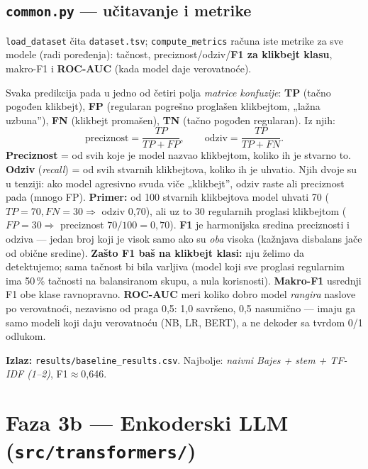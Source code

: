 \documentclass[11pt,a4paper]{article}
\newcommand{\kod}[1]{\texttt{#1}}
\begin{document}
\subsection{\texttt{common.py} --- učitavanje i metrike}
\kod{load\_dataset} čita \kod{dataset.tsv}; \kod{compute\_metrics} računa iste metrike
za sve modele (radi poređenja): tačnost, preciznost/odziv/\textbf{F1 za klikbejt
klasu}, makro-F1 i \textbf{ROC-AUC} (kada model daje verovatnoće).

\begin{teorija}
Svaka predikcija pada u jedno od četiri polja \emph{matrice konfuzije}: \textbf{TP}
(tačno pogođen klikbejt), \textbf{FP} (regularan pogrešno proglašen klikbejtom, „lažna
uzbuna''), \textbf{FN} (klikbejt promašen), \textbf{TN} (tačno pogođen regularan). Iz
njih:
\[
\text{preciznost}=\frac{TP}{TP+FP}, \qquad \text{odziv}=\frac{TP}{TP+FN}.
\]
\textbf{Preciznost} = od svih koje je model nazvao klikbejtom, koliko ih je stvarno to.
\textbf{Odziv} (\emph{recall}) = od svih stvarnih klikbejtova, koliko ih je uhvatio.
Njih dvoje su u tenziji: ako model agresivno svuda viče „klikbejt'', odziv raste ali
preciznost pada (mnogo FP). \textbf{Primer:} od 100 stvarnih klikbejtova model uhvati
70 ($TP{=}70, FN{=}30 \Rightarrow$ odziv 0,70), ali uz to 30 regularnih proglasi
klikbejtom ($FP{=}30 \Rightarrow$ preciznost $70/100=0{,}70$). \textbf{F1} je
harmonijska sredina preciznosti i odziva --- jedan broj koji je visok samo ako su
\emph{oba} visoka (kažnjava disbalans jače od obične sredine). \textbf{Zašto F1 baš na
klikbejt klasi:} nju želimo da detektujemo; sama tačnost bi bila varljiva (model koji
sve proglasi regularnim ima 50\,\% tačnosti na balansiranom skupu, a nula korisnosti).
\textbf{Makro-F1} usrednji F1 obe klase ravnopravno. \textbf{ROC-AUC} meri koliko dobro
model \emph{rangira} naslove po verovatnoći, nezavisno od praga 0,5: 1,0 savršeno, 0,5
nasumično --- imaju ga samo modeli koji daju verovatnoću (NB, LR, BERT), a ne dekoder
sa tvrdom 0/1 odlukom.
\end{teorija}

\textbf{Izlaz:} \kod{results/baseline\_results.csv}. Najbolje: \emph{naivni Bajes +
stem + TF-IDF (1--2)}, F1$\approx$0,646.

\section{Faza 3b --- Enkoderski LLM (\texttt{src/transformers/})}
\end{document}
